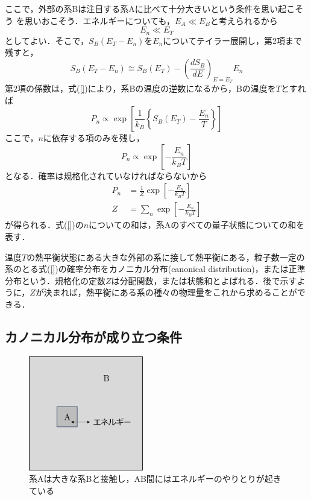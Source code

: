 \documentclass[a4paper,11pt]{jsarticle}
\begin{document}
ここで，外部の系Bは注目する系Aに比べて十分大きいという条件を思い起こそう
を思いおこそう．エネルギーについても，$E_A \ll E_B$と考えられるから
\begin{equation}
  E_n \ll E_T
\end{equation}
としてよい．そこで，$S_B(E_T-E_n)$を$E_n$についてテイラー展開し，第2項まで残すと，
\begin{equation}
  S_B(E_T-E_n)
  \cong S_B(E_T) - \left( \frac{dS_B}{dE} \right)_{E=E_T}E_n
\end{equation}
第2項の係数は，式(\ref{})により，系Bの温度の逆数になるから，Bの温度を$T$とすれば
\begin{equation}
  P_n
  \propto \exp{\left[ \frac{1}{k_B}\left\{ S_B(E_T) - \frac{E_n}{T} \right\} \right]}
\end{equation}
ここで，$n$に依存する項のみを残し，
\begin{equation}
  P_n \propto \exp{\left[ -\frac{E_n}{k_B T} \right]}
\end{equation}
となる．確率は規格化されていなければならないから
\begin{align}
  P_n & = \frac{1}{Z}\exp{\left[ -\frac{E_n}{k_B T} \right]} \\
  Z   & = \sum_{n}\exp{\left[ -\frac{E_n}{k_B T} \right]}
\end{align}
が得られる．式(\ref{})の$n$についての和は，系Aのすべての量子状態についての和を表す．\par
温度$T$の熱平衡状態にある大きな外部の系に接して熱平衡にある，粒子数一定の系のとる式(\ref{})の確率分布をカノニカル分布(canonical distribution)，または正準分布という．規格化の定数$Z$は分配関数，または状態和とよばれる．後で示すように，$Z$が決まれば，熱平衡にある系の種々の物理量をこれから求めることができる．

\subsection*{カノニカル分布が成り立つ条件}


















\begin{figure}
  \begin{center}
    \includegraphics[height=5cm]{graph/canonical.png}
    \caption{系Aは大きな系Bと接触し，AB間にはエネルギーのやりとりが起きている\label{canonical}}
  \end{center}
\end{figure}
\end{document}
